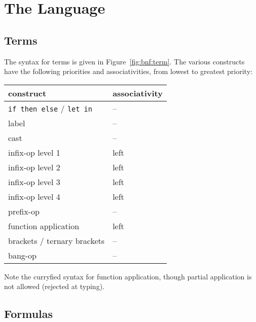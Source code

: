 \newpage


\section{The \why Language}

\subsection{Terms}

The syntax for terms is given in Figure~\ref{fig:bnf:term}.
The various constructs have the following priorities and
associativities, from lowest to greatest priority:
\begin{center}
  \begin{tabular}{|l|l|}
    \hline
    construct & associativity \\
    \hline\hline
    \texttt{if then else} / \texttt{let in} & -- \\
    label & -- \\
    cast  & -- \\
    infix-op level 1 & left \\
    infix-op level 2 & left \\
    infix-op level 3 & left \\
    infix-op level 4 & left \\
    prefix-op     & --   \\
    function application & left \\
    brackets / ternary brackets & -- \\
    bang-op       & --   \\
    \hline
  \end{tabular}
\end{center}

Note the curryfied syntax for function application, though partial
application is not allowed (rejected at typing).

\subsection{Formulas}

